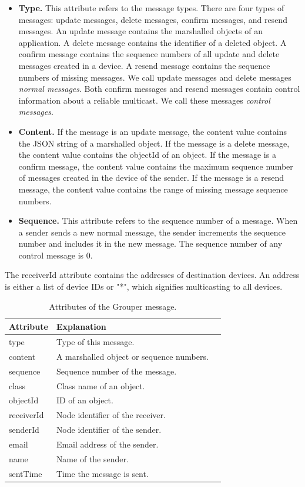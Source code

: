 \documentclass[a4paper,11pt]{report}
\begin{document}
\begin{itemize}[leftmargin=7mm]
	\setlength{\itemsep}{1pt}
	\setlength{\parskip}{0pt}
	\setlength{\parsep}{0pt}
	\item \textbf{Type.}
	This attribute refers to the message types.
	There are four types of messages: update messages, delete messages, confirm messages, and resend messages.
	An update message contains the marshalled objects of an application.
	A delete message contains the identifier of a deleted object.
	A confirm message contains the sequence numbers of all update and delete messages created in a device.
	A resend message contains the sequence numbers of missing messages.
	We call update messages and delete messages \emph{normal messages}. 
	Both confirm messages and resend messages contain control information about a reliable multicast. 
	We call these messages \emph{control messages}.
	\item \textbf{Content.} 
	If the message is an update message, the content value contains the JSON string of a marshalled object.
	If the message is a delete message, the content value contains the objectId of an object.
	If the message is a confirm message, the content value contains the maximum sequence number of messages created in the device of the sender.
	If the message is a resend message, the content value contains the range of missing message sequence numbers.
	\item \textbf{Sequence.}
	This attribute refers to the sequence number of a message.
	When a sender sends a new normal message, the sender increments the sequence number and includes it in the new message.
	The sequence number of any control message is 0.
\end{itemize}

The receiverId attribute contains the addresses of destination devices.
An address is either a list of device IDs or "*", which signifies multicasting to all devices.

\begin{table}[t]
	\centering
	\begin{tabular}{lll}
		\toprule
		\textbf{Attribute} & \textbf{Explanation} \\ 
		\midrule
		type & Type of this message. \\
		content & A marshalled object or sequence numbers. \\
		sequence & Sequence number of the message. \\
		class & Class name of an object. \\
		objectId & ID of an object. \\
		receiverId & Node identifier of the receiver. \\
		senderId & Node identifier of the sender. \\
		email & Email address of the sender. \\
		name & Name of the sender. \\
		sentTime & Time the message is sent. \\
		\bottomrule
	\end{tabular}
	\caption{Attributes of the Grouper message.}
	\label{table:grouper_message_attributes}
\end{table}
\end{document}
